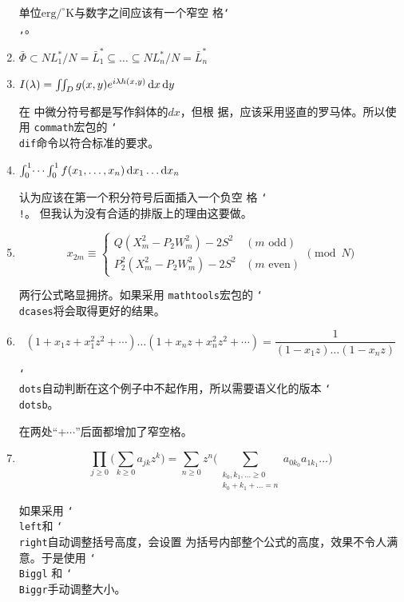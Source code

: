 \documentclass[UTF8,a4paper,scheme=plain,%
punct=quanjiao]{ctexart}
\newcommand*{\cmd}[1]{\texttt{\char`\\#1}}
\begin{document}
\begin{enumerate}[label=Challenge \arabic*]
  单位\(\textrm{erg}/^\circ\textrm{K}\)与数字之间应该有一个窄空
  格\cmd{,}。

  \index{\cmd{,}}

\item
  \(\bar\Phi\subset NL_1^*/N=\bar L_1^*\subseteq\dots\subseteq
  NL_n^*/N=\bar L_n^*\)

\item \(I(\lambda)=\iint_Dg(x,y)e^{i\lambda h(x,y)}\operatorname{d\!} x\operatorname{d\!} y\)

  在 中微分符号都是写作斜体的\(dx\)，但根
  据\citeauthor{ISO80000-2}，应该采用竖直的罗马体。所以使
  用 \texttt{commath}宏包的 \cmd{dif}命令以符合标准的要求。

  \index{\cmd{dif}}

\item \(\int_0^1\dotsi\int_0^1f(x_1,\dots,x_n)\operatorname{d\!} x_1\dots\operatorname{d\!} x_n\)

  认为应该在第一个积分符号后面插入一个负空
  格 \cmd{!}。 但我认为没有合适的排版上的理由这要做。
  
\item
  \[x_{2m}\equiv\begin{cases}
      Q(X_m^2-P_2W_m^2)-2S^2&(m\textrm{ odd})\\
      P_2^2(X_m^2-P_2W_m^2)-2S^2&(m\textrm{ even})
    \end{cases}\pmod N
  \]

  两行公式略显拥挤。如果采用 \texttt{mathtools}宏包的
  \cmd{dcases}将会取得更好的结果。

  \index{\cmd{pmod}}

\item
  \[(1+x_1z+x_1^2z^2+\dotsb)\dots(1+x_nz+x_n^2z^2+\dotsb)=
    \frac1{(1-x_1z)\dots(1-x_nz)}
  \]

  \cmd{dots}自动判断在这个例子中不起作用，所以需要语义化的版本
  \cmd{dotsb}。

  \index{\cmd{dots}!\cmd{dotsb}}

  在两处“\(+\dotsb\)”后面都增加了窄空格。

\item
  \[\prod_{j\ge0}\biggl(\sum_{k\ge0}a_{jk}z^k\biggr)=
    \sum_{n\ge0}z^n\Biggl(\sum_{\substack{
        k_0,k_1,\dotsc\ge0\\
        k_0+k_1+\dots=n}} a_{0k_0}a_{1k_1}\dots\Biggr)
  \]

  如果采用 \cmd{left}和 \cmd{right}自动调整括号高度，会设置
  为括号内部整个公式的高度，效果不令人满意。于是使用 \cmd{Biggl}
  和 \cmd{Biggr}手动调整大小。


\end{enumerate}
\end{document}
